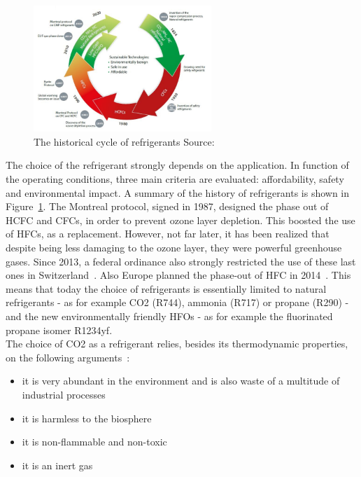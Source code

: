 \documentclass{article}
\begin{document}
\begin{figure}[h!]
	\centering
	\includegraphics[width=0.6\textwidth]{refrigerants.JPG}
	\caption{The historical cycle of refrigerants Source:~\cite{danfossRefrigerantOptionsNow2017}}
	\label{fig:refrigerants}
\end{figure}

The choice of the refrigerant strongly depends on the application. In function of the operating conditions, three main criteria are evaluated: affordability, safety and environmental impact.
A summary of the history of refrigerants is shown in Figure~\ref{fig:refrigerants}.
The Montreal protocol, signed in 1987, designed the phase out of HCFC and CFCs, in order to prevent ozone layer depletion. This boosted the use of HFCs, as a replacement. However, not far later, it has been realized that despite being less damaging to the ozone layer, they were powerful greenhouse gases. Since 2013, a federal ordinance also strongly restricted the use of these last ones in Switzerland~\cite{hydrocarbons21.comSwitzerlandIntroduceHFC}. Also Europe planned the phase-out of HFC in 2014~\cite{europeancommissionforclimateactionEULegislationControl2016}. This means that today the choice of refrigerants is essentially limited to natural refrigerants - as for example CO2 (R744), ammonia (R717) or propane (R290) - and the new environmentally friendly HFOs - as for example the fluorinated propane isomer R1234yf.\\

The choice of CO2 as a refrigerant relies, besides its thermodynamic properties, on the following arguments~\cite{cavalliniPropertiesCO2Refrigerant2004}:
\begin{itemize}
	\item it is very abundant in the environment and is also waste of a multitude of industrial processes
	\item it is harmless to the biosphere
	\item it is non-flammable and non-toxic
	\item it is an inert gas
\end{itemize}
\end{document}
